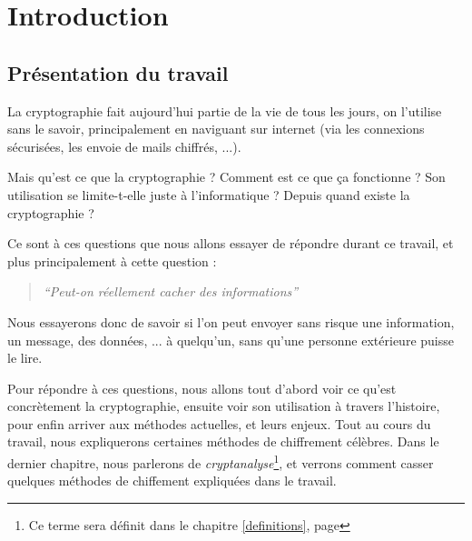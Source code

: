 \chapter{Introduction}

\section{Présentation du travail}
La cryptographie fait aujourd'hui partie de la vie de tous les jours, on l'utilise sans le savoir, principalement en naviguant sur internet (via les connexions sécurisées, les envoie de mails chiffrés, ...).

Mais qu'est ce que la cryptographie ? Comment est ce que ça fonctionne ? Son utilisation se limite-t-elle juste à l'informatique ? Depuis quand existe la cryptographie ?

Ce sont à ces questions que nous allons essayer de répondre durant ce travail, et plus principalement à cette question : 

\begin{quote}
\emph{``Peut-on réellement cacher des informations''}
\end{quote}

Nous essayerons donc de savoir si l'on peut envoyer sans risque une information, un message, des données, ... à quelqu'un, sans qu'une personne extérieure puisse le lire.

Pour répondre à ces questions, nous allons tout d'abord voir ce qu'est concrètement la cryptographie, ensuite voir son utilisation à travers l'histoire, pour enfin arriver aux méthodes actuelles, et leurs enjeux. Tout au cours du travail, nous expliquerons certaines méthodes de chiffrement célèbres. Dans le dernier chapitre, nous parlerons de \emph{cryptanalyse}\footnote{Ce terme sera définit dans le chapitre \ref{definitions}, page \pageref{definitions}}, et verrons comment casser quelques méthodes de chiffement expliquées dans le travail.


